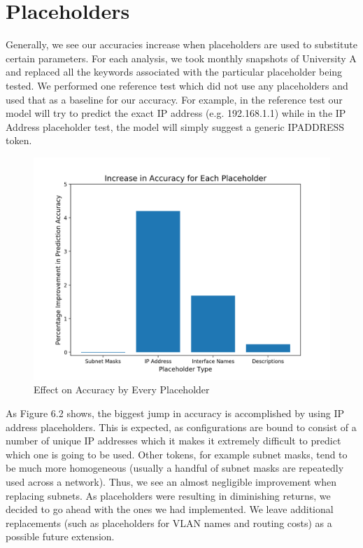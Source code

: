 \documentclass[../thesis.tex]{subfiles}
\begin{document}
\section{Placeholders}

Generally, we see our accuracies increase when placeholders are used to substitute certain parameters. For each analysis, we took monthly snapshots of University A and replaced all the keywords associated with the particular placeholder being tested. We performed one reference test which did not use any placeholders and used that as a baseline for our accuracy. For example, in the reference test our model will try to predict the exact IP address (e.g. 192.168.1.1) while in the IP Address placeholder test, the model will simply suggest a generic IPADDRESS token.

\begin{figure}[H]
	\centering
	\includegraphics[width=\textwidth]{placeholders.png}
	\caption{Effect on Accuracy by Every Placeholder}
\end{figure}

As Figure 6.2 shows, the biggest jump in accuracy is accomplished by using IP address placeholders. This is expected, as configurations are bound to consist of a number of unique IP addresses which it makes it extremely difficult to predict which one is going to be used. Other tokens, for example subnet masks, tend to be much more homogeneous (usually a handful of subnet masks are repeatedly used across a network). Thus, we see an almost negligible improvement when replacing subnets. As placeholders were resulting in diminishing returns, we decided to go ahead with the ones we had implemented. We leave additional replacements (such as placeholders for VLAN names and routing costs) as a possible future extension.
\end{document}
